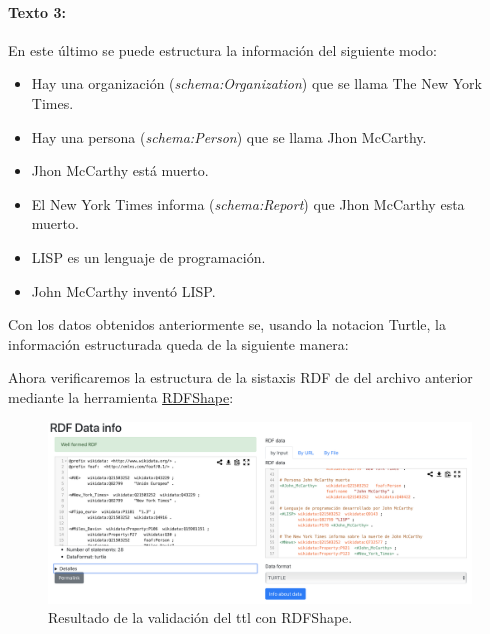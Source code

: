 \documentclass[spanish]{llncs}   %
\begin{document}
\paragraph{Texto 3:}

En este último se  puede estructura la información del siguiente modo:

\begin{itemize}
    \item Hay una organización (\textit{schema:Organization}) que se llama The New York Times.
    \item Hay una persona (\textit{schema:Person}) que se llama Jhon McCarthy.
    \item Jhon McCarthy está muerto.
    \item El New York Times informa (\textit{schema:Report}) que Jhon McCarthy esta muerto.
    \item LISP es un lenguaje de programación.
    \item John McCarthy inventó LISP.
\end{itemize}

Con los datos obtenidos anteriormente se, usando la notacion Turtle, la información estructurada queda de la siguiente manera:



Ahora verificaremos la estructura de la sistaxis RDF de del archivo anterior mediante la herramienta \href{http://rdfshape.weso.es/dataInfo}{RDFShape}:

\begin{figure}[h]
    \centering
    \includegraphics[width=\textwidth]{resources/RDFValidation.png}
    \caption{Resultado de la validación del ttl con RDFShape.}
    \label{Fig.1}
\end{figure}
\end{document}
